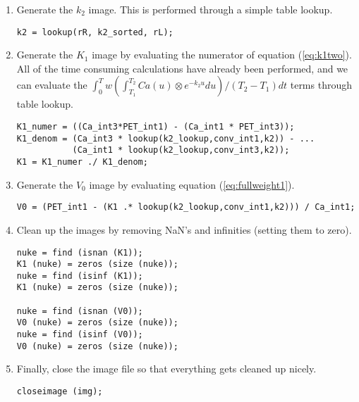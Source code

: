 \begin{enumerate}
\begin{verbatim}
[rR,sort_order] = sort (rR);
k2_sorted = k2_lookup (sort_order);
\end{verbatim}

\item Generate the $k_2$ image.  This is performed through a simple
table lookup.
\begin{verbatim}
k2 = lookup(rR, k2_sorted, rL);
\end{verbatim}

\item Generate the $K_1$ image by evaluating the numerator of
equation (\ref{eq:k1two}).  All of the time consuming calculations
have already been performed, and we can evaluate the $\int_{0}^{T} w
(\int_{T_1}^{T_2} Ca(u) \otimes e^{-k_{2}u} du)/(T_2 - T_1) dt$ terms
through table lookup.
\begin{verbatim}
K1_numer = ((Ca_int3*PET_int1) - (Ca_int1 * PET_int3));
K1_denom = (Ca_int3 * lookup(k2_lookup,conv_int1,k2)) - ...
           (Ca_int1 * lookup(k2_lookup,conv_int3,k2));
K1 = K1_numer ./ K1_denom;
\end{verbatim}

\item Generate the $V_0$ image by evaluating equation
(\ref{eq:fullweight1}).
\begin{verbatim}
V0 = (PET_int1 - (K1 .* lookup(k2_lookup,conv_int1,k2))) / Ca_int1;
\end{verbatim}

\item Clean up the images by removing NaN's and infinities (setting
them to zero).

\begin{verbatim}
nuke = find (isnan (K1));
K1 (nuke) = zeros (size (nuke));
nuke = find (isinf (K1));
K1 (nuke) = zeros (size (nuke));

nuke = find (isnan (V0));
V0 (nuke) = zeros (size (nuke));
nuke = find (isinf (V0));
V0 (nuke) = zeros (size (nuke));
\end{verbatim}

\item Finally, close the image file so that everything gets cleaned
up nicely.
\begin{verbatim}
closeimage (img);
\end{verbatim}

\end{enumerate}






\newpage
